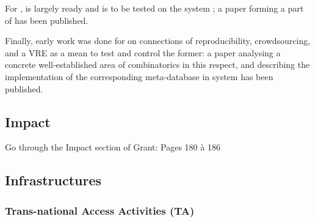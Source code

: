 \documentclass{deliverablereport}
\begin{document}
\begin{itemize}
For ,
 is largely ready and is to
be tested on the system \Sage; a paper
\cite{Pavlou:2016:MCI:2936924.2936934} forming a part of
 has been published.

Finally, early work was done for
 on connections of
reproducibility, crowdsourcing, and a VRE as a mean to test and
control the former: a paper \cite{2016arXiv160100181C} analysing a
concrete well-established area of combinatorics in this respect, and
describing the implementation of the corresponding meta-database in
\Sage system has been published.

\subsection{Impact}

Go through the Impact section of Grant: Pages 180 à 186

\subsection{Infrastructures}

\subsubsection{Trans-national Access Activities (TA)}





\end{itemize}
\end{document}
